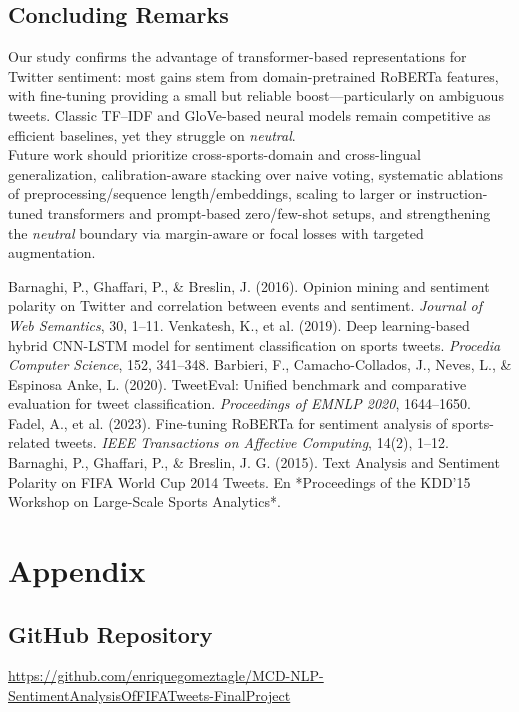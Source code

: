 \documentclass[10pt]{article}
\begin{document}
\subsection{Concluding Remarks}
Our study confirms the advantage of transformer-based representations for Twitter sentiment: most gains stem from domain-pretrained RoBERTa features, with fine-tuning providing a small but reliable boost—particularly on ambiguous tweets. Classic TF--IDF and GloVe-based neural models remain competitive as efficient baselines, yet they struggle on \emph{neutral}.\\
Future work should prioritize cross-sports-domain and cross-lingual generalization, calibration-aware stacking over naive voting, systematic ablations of preprocessing/sequence length/embeddings, scaling to larger or instruction-tuned transformers and prompt-based zero/few-shot setups, and strengthening the \emph{neutral} boundary via margin-aware or focal losses with targeted augmentation.
\begin{thebibliography}{9}
 Barnaghi, P., Ghaffari, P., \& Breslin, J. (2016). Opinion mining and sentiment polarity on Twitter and correlation between events and sentiment. \textit{Journal of Web Semantics}, 30, 1–11.
 Venkatesh, K., et al. (2019). Deep learning-based hybrid CNN-LSTM model for sentiment classification on sports tweets. \textit{Procedia Computer Science}, 152, 341–348.
 Barbieri, F., Camacho-Collados, J., Neves, L., \& Espinosa Anke, L. (2020). TweetEval: Unified benchmark and comparative evaluation for tweet classification. \textit{Proceedings of EMNLP 2020}, 1644–1650.
 Fadel, A., et al. (2023). Fine-tuning RoBERTa for sentiment analysis of sports-related tweets. \textit{IEEE Transactions on Affective Computing}, 14(2), 1–12.
Barnaghi, P., Ghaffari, P., \& Breslin, J. G. (2015). Text Analysis and Sentiment Polarity on FIFA World Cup 2014 Tweets. En *Proceedings of the KDD’15 Workshop on Large-Scale Sports Analytics*.  
\end{thebibliography}
\section{Appendix}
\subsection{GitHub Repository}
\url{https://github.com/enriquegomeztagle/MCD-NLP-SentimentAnalysisOfFIFATweets-FinalProject}
\end{document}
